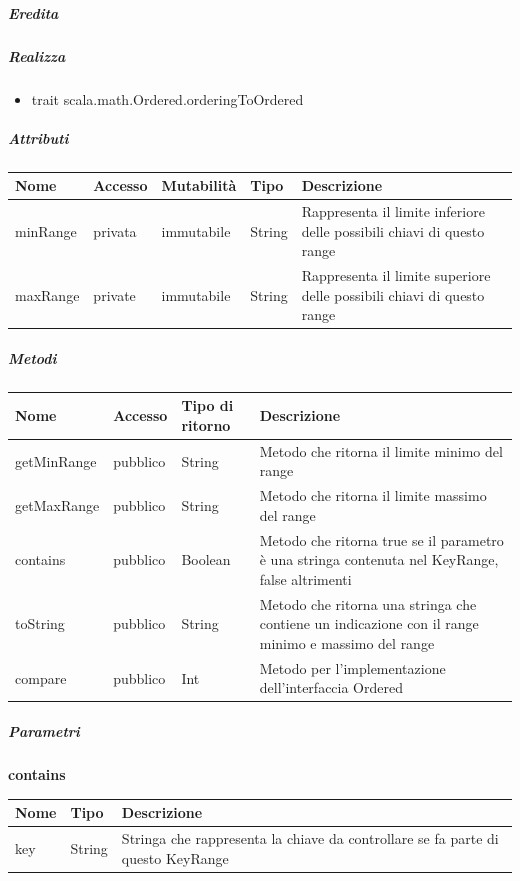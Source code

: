 \documentclass{scalatekids-article}
\begin{document}
\subparagraph{Eredita}

\subparagraph{Realizza}
\begin{itemize}
\item trait scala.math.Ordered.orderingToOrdered
\end{itemize}

\subparagraph{Attributi}
\begin{tabular}{| p{3cm} | p{1.5cm} | p{2cm} | p{2cm} | p{8.5cm} |}
  \hline
  Nome & Accesso & Mutabilità & Tipo & Descrizione\\
  \hline
  minRange & privata & immutabile & String & Rappresenta il limite inferiore delle possibili chiavi di questo range \\
  \hline
  maxRange & private & immutabile & String & Rappresenta il limite superiore delle possibili chiavi di questo range \\
  \hline
\end{tabular}

\subparagraph{Metodi} %
\begin{tabular}{| p{3cm} | p{1.5cm} | p{3.5cm} | p{9cm} |}
  \hline
  Nome & Accesso & Tipo di ritorno & Descrizione\\
  \hline
  getMinRange & pubblico & String & Metodo che ritorna il limite minimo del range \\
  \hline
  getMaxRange & pubblico & String & Metodo che ritorna il limite massimo del range \\
  \hline
  contains & pubblico & Boolean & Metodo che ritorna true se il parametro è una stringa contenuta nel KeyRange, false altrimenti\\
  \hline
  toString & pubblico & String & Metodo che ritorna una stringa che contiene un indicazione con il range minimo e massimo del range\\
  \hline
  compare & pubblico & Int & Metodo per l'implementazione dell'interfaccia Ordered\\
  \hline
\end{tabular}

\subparagraph{Parametri}
\begin{center}
  \textbf{contains}\\
\end{center}
\begin{tabular}{| l | l | l |}
  \hline
  Nome & Tipo & Descrizione\\
  \hline
  key & String & Stringa che rappresenta la chiave da controllare se fa parte di questo KeyRange \\
  \hline
\end{tabular}
\end{document}
